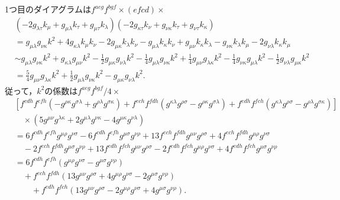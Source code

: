 1つ目のダイアグラムは$f^{aeg} f^{bgf} \times (efcd) \times$
\begin{align*}
  &\left( - 2 g_{\lambda\tau} k_{\mu} + g_{\mu\lambda} k_{\tau} + g_{\mu\tau} k_{\lambda} \right)
  \left( - 2 g_{\kappa\tau} k_{\nu} + g_{\nu\kappa} k_{\tau} + g_{\nu\tau} k_{\kappa} \right) \\
  &=g_{\mu\lambda} g_{\nu\kappa} k^2
  + 4 g_{\kappa\lambda} k_{\mu} k_{\nu} - 2 g_{\mu\kappa} k_{\lambda} k_{\nu}
  - g_{\mu\lambda} k_{\kappa} k_{\nu} + g_{\mu\nu} k_{\kappa} k_{\lambda}
  - g_{\nu\kappa} k_{\lambda} k_{\mu} - 2 g_{\nu\lambda} k_{\kappa} k_{\mu} \\
  &\sim g_{\mu\lambda} g_{\nu\kappa} k^2
  + g_{\kappa\lambda} g_{\mu\nu} k^2 - \frac{1}{2} g_{\mu\kappa} g_{\nu\lambda} k^2
  - \frac{1}{4} g_{\mu\lambda} g_{\nu\kappa} k^2 + \frac{1}{4} g_{\mu\nu} g_{\lambda\kappa} k^2
  - \frac{1}{4} g_{\nu\kappa} g_{\mu\lambda} k^2 - \frac{1}{2} g_{\nu\lambda} g_{\mu\kappa} k^2 \\
  &= \frac{5}{4} g_{\mu\nu} g_{\lambda\kappa} k^2
  + \frac{1}{2} g_{\mu\lambda} g_{\nu\kappa} k^2
  - g_{\mu\kappa} g_{\nu\lambda} k^2 .
\end{align*}
従って，$k^2$の係数は$f^{aeg} f^{bgf}/4 \times$
\begin{align*}
  & \left[
  f^{cdh} f^{efh} \left(- g^{\rho\kappa} g^{\sigma\lambda} + g^{\rho\lambda} g^{\sigma\kappa}\right)
  + f^{ech} f^{fdh} \left(g^{\kappa\lambda} g^{\rho\sigma} - g^{\rho\kappa} g^{\sigma\lambda}\right)
  + f^{edh} f^{fch} \left(g^{\kappa\lambda} g^{\rho\sigma} - g^{\rho\lambda} g^{\sigma\kappa}\right) \right] \\
  &\quad\times \left( 5g^{\mu\nu} g^{\lambda\kappa} + 2g^{\mu\lambda} g^{\nu\kappa} - 4g^{\mu\kappa} g^{\nu\lambda} \right) \\
  &= 6 f^{cdh} f^{efh} g^{\mu\rho} g^{\nu\sigma} - 6 f^{cdh} f^{efh} g^{\mu\sigma} g^{\nu\rho}
  + 13 f^{ech} f^{fdh} g^{\mu\nu} g^{\rho\sigma} + 4 f^{ech} f^{fdh} g^{\mu\rho} g^{\nu\sigma} \\
  &\quad - 2 f^{ech} f^{fdh} g^{\mu\sigma} g^{\nu\rho} + 13 f^{edh} f^{fch} g^{\mu\nu} g^{\rho\sigma}
  - 2 f^{edh} f^{fch} g^{\mu\rho} g^{\nu\sigma} + 4 f^{edh} f^{fch} g^{\mu\sigma} g^{\nu\rho} \\
  &= 6 f^{cdh} f^{efh} (g^{\mu\rho} g^{\nu\sigma} - g^{\mu\sigma} g^{\nu\rho}) \\
  &\quad + f^{ech} f^{fdh} (13g^{\mu\nu} g^{\rho\sigma} + 4g^{\mu\rho} g^{\nu\sigma} - 2g^{\mu\sigma} g^{\nu\rho}) \\
  &\qquad + f^{edh} f^{fch} (13g^{\mu\nu} g^{\rho\sigma} - 2g^{\mu\rho} g^{\nu\sigma} + 4g^{\mu\sigma} g^{\nu\rho}) .
\end{align*}
